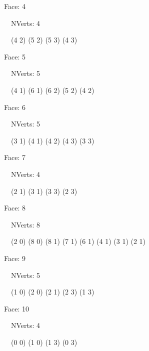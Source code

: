 \documentclass{article}
\begin{document}
    {\footnotesize

    Face: 4

    \   \    NVerts: 4

     \   \   (4 2) (5 2) (5 3) (4 3)}

    {\footnotesize

    Face: 5

    \   \    NVerts: 5

     \   \   (4 1) (6 1) (6 2) (5 2) (4 2)}

    {\footnotesize

    Face: 6

    \   \    NVerts: 5

     \   \   (3 1) (4 1) (4 2) (4 3) (3 3)}

    {\footnotesize

    Face: 7

    \   \    NVerts: 4

     \   \   (2 1) (3 1) (3 3) (2 3)}

    {\footnotesize

    Face: 8

    \   \    NVerts: 8

     \   \   (2 0) (8 0) (8 1) (7 1) (6 1) (4 1) (3 1) (2 1)}

    {\footnotesize

    Face: 9

    \   \    NVerts: 5

     \   \   (1 0) (2 0) (2 1) (2 3) (1 3)}

    {\footnotesize

    Face: 10

    \   \    NVerts: 4

     \   \   (0 0) (1 0) (1 3) (0 3)}


     \newpage
\end{document}
